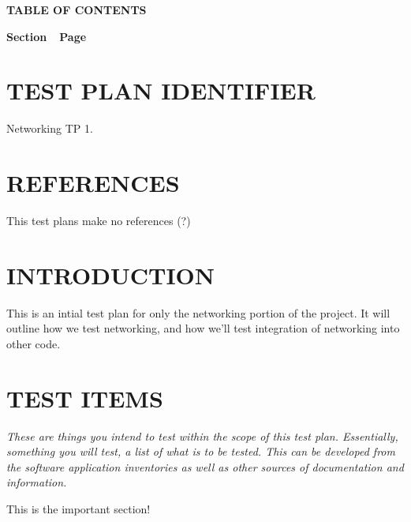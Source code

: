 {\centering{}\bfseries\color{black}
TABLE OF CONTENTS
\par}

{\bfseries\color{black}
Section\ \ Page}

\setcounter{tocdepth}{9}
\renewcommand\contentsname{}
\tableofcontents

\bigskip

\bigskip
\setcounter{page}{1}\pagestyle{Convertiv}

\section[IDENTIFIER]{\bfseries\color{black}
TEST PLAN IDENTIFIER}


{\color{black}
Networking TP 1.
}


\section[REFERENCES]{\bfseries\color{black}
REFERENCES}

{\color{black}
This test plans make no references (?)
}



\section[INTRODUCTION]{\bfseries\color{black} INTRODUCTION}

{\color{black}

This is an intial test plan for only the networking portion of the
project. It will outline how we test networking, and how we'll test
integration of networking into other code.

}

\section[TEST ITEMS]{\bfseries\color{black} TEST ITEMS}

{\itshape\color{black}
These are things you intend to test within the scope of this test
plan. Essentially, something you will test, a list of what is to be
tested. This can be developed from the software application
inventories as well as other sources of documentation and information.
}

{\color{black}

This is the important section!

}

